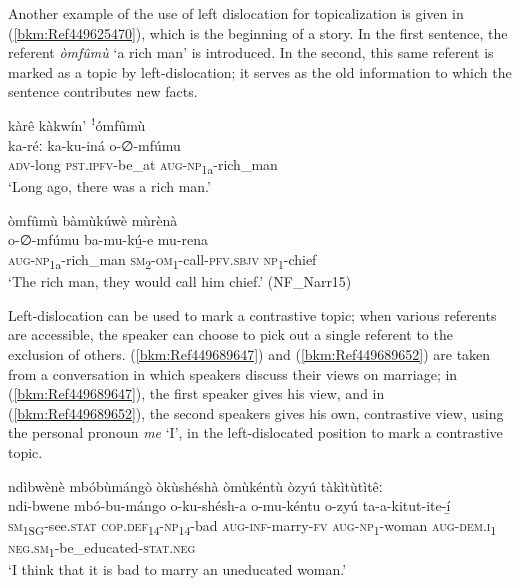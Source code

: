 Another example of the use of left dislocation for topicalization is given in (\ref{bkm:Ref449625470}), which is the beginning of a story. In the first sentence, the referent \textit{òmfûmù} ‘a rich man’ is introduced. In the second, this same referent is marked as a topic by left-dislocation; it serves as the old information to which the sentence contributes new facts.

\ea
\label{bkm:Ref449625470}
kàrê kàkwín’ ꜝómfûmù\\
\gll ka-réː    ka-ku-iná    o-∅-mfúmu\\
\textsc{adv}-long  \textsc{pst}.\textsc{ipfv}-be\_at  \textsc{aug}-\textsc{np}\textsubscript{1a}-rich\_man\\
\glt ‘Long ago, there was a rich man.’
\z

\ea
òmfûmù bàmùkúwè mùrènà\\
\gll o-∅-mfúmu    ba-mu-kú̲-e      mu-rena\\
\textsc{aug}-\textsc{np}\textsubscript{1a}-rich\_man  \textsc{sm}\textsubscript{2}-\textsc{om}\textsubscript{1}-call-\textsc{pfv}.\textsc{sbjv}  \textsc{np}\textsubscript{1}-chief\\
\glt ‘The rich man, they would call him chief.’ (NF\_Narr15)
\z

Left-dislocation can be used to mark a contrastive topic; when various referents are accessible, the speaker can choose to pick out a single referent to the exclusion of others. (\ref{bkm:Ref449689647}) and (\ref{bkm:Ref449689652}) are taken from a conversation in which speakers discuss their views on marriage; in (\ref{bkm:Ref449689647}), the first speaker gives his view, and in (\ref{bkm:Ref449689652}), the second speakers gives his own, contrastive view, using the personal pronoun \textit{me} ‘I’, in the left-dislocated position to mark a contrastive topic.

\ea
\label{bkm:Ref449689647}
ndìbwènè mbóbùmángò òkùshéshà òmùkéntù òzyú tàkìtùtìtêː\\
\gll ndi-bwene    mbó-bu-mángo  o-ku-shésh-a    o-mu-kéntu o-zyú    ta-a-kitut-ite-í̲\\
\textsc{sm}\textsubscript{1SG}-see.\textsc{stat}  \textsc{cop}.\textsc{def}\textsubscript{14}-\textsc{np}\textsubscript{14}-bad  \textsc{aug}-\textsc{inf}-marry-\textsc{fv}  \textsc{aug}-\textsc{np}\textsubscript{1}-woman
\textsc{aug}-\textsc{dem}.\textsc{i}\textsubscript{1}  \textsc{neg}.\textsc{sm}\textsubscript{1}-be\_educated-\textsc{stat}.\textsc{neg}\\
\glt ‘I think that it is bad to marry an uneducated woman.’
\z

